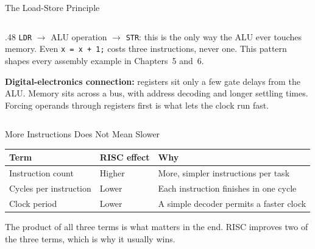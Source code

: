 \documentclass[9pt,aspectratio=169,xcolor=table]{beamer}
\begin{document}
\begin{frame}{The Load-Store Principle}
\begin{columns}[c]
\begin{column}{.48\textwidth}
        \vspace{3mm}
        {\small \texttt{LDR} $\to$ ALU operation $\to$ \texttt{STR}: this is the \alert{only} way the ALU ever touches memory. Even \texttt{x = x + 1;} costs \alert{three} instructions, never one. This pattern shapes every assembly example in Chapters~5 and~6.}

        \vspace{3mm}
        {\small \textbf{Digital-electronics connection:} registers sit only a few gate delays from the ALU. Memory sits across a bus, with address decoding and longer settling times. Forcing operands through registers first is what lets the clock run fast.}
    \end{column}
    \end{columns}
\end{frame}

\begin{frame}{More Instructions Does Not Mean Slower}
    \begin{center}
    \end{center}
    \vspace{4mm}
    \begin{center}
    {\small
    \striped
    \begin{tabular}{@{}l l l@{}}
        \toprule
        \textbf{Term} & \textbf{RISC effect} & \textbf{Why} \\
        \midrule
        Instruction count & \alert{Higher} & More, simpler instructions per task \\
        Cycles per instruction & \alert{Lower} & Each instruction finishes in one cycle \\
        Clock period & \alert{Lower} & A simple decoder permits a faster clock \\
        \bottomrule
    \end{tabular}}
    \end{center}
    \vspace{3mm}
    {\small The product of all three terms is what matters in the end. RISC improves two of the three terms, which is why it usually wins.}
\end{frame}
\end{document}
